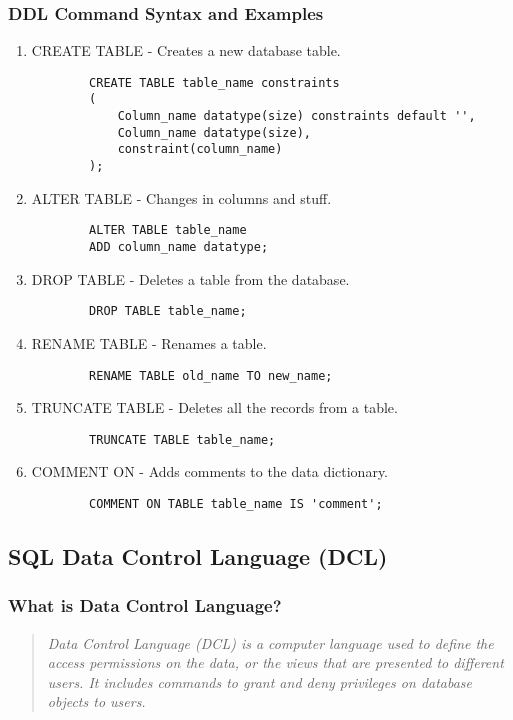 \documentclass[11pt]{article}
\begin{document}
\subsubsection{DDL Command Syntax and Examples}

\begin{enumerate}
	\item CREATE TABLE - Creates a new database table.
	      \begin{verbatim}
		CREATE TABLE table_name constraints
		(
			Column_name datatype(size) constraints default '',
			Column_name datatype(size),
			constraint(column_name)
		);
	\end{verbatim}
	\item ALTER TABLE - Changes in columns and stuff.
	      \begin{verbatim}
		ALTER TABLE table_name
		ADD column_name datatype;
	\end{verbatim}
	\item DROP TABLE - Deletes a table from the database.
	      \begin{verbatim}
		DROP TABLE table_name;
	\end{verbatim}
	\item RENAME TABLE - Renames a table.
	      \begin{verbatim}
		RENAME TABLE old_name TO new_name;
	\end{verbatim}
	\item TRUNCATE TABLE - Deletes all the records from a table.
	      \begin{verbatim}
		TRUNCATE TABLE table_name;
	\end{verbatim}
	\item COMMENT ON - Adds comments to the data dictionary.
	      \begin{verbatim}
		COMMENT ON TABLE table_name IS 'comment';
	\end{verbatim}
\end{enumerate}

\subsection{SQL Data Control Language (DCL)}

\subsubsection{What is Data Control Language?}
\begin{quote}
	\textit{Data Control Language (DCL) is a computer language used to define the access permissions on the data, or the views that are presented to different users. It includes commands to grant and deny privileges on database objects to users.}
\end{quote}
\end{document}
